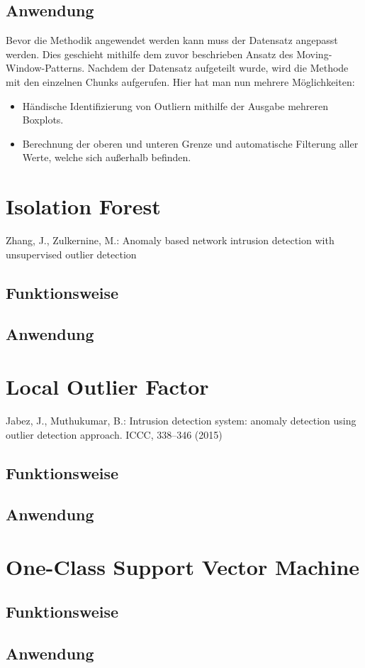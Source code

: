 \FloatBarrier

\subsection{Anwendung}
Bevor die Methodik angewendet werden kann muss der Datensatz angepasst werden. Dies geschieht mithilfe dem zuvor beschrieben Ansatz des Moving-Window-Patterns. Nachdem der Datensatz aufgeteilt wurde, wird die Methode mit den einzelnen Chunks aufgerufen. Hier hat man nun mehrere Möglichkeiten: 
\begin{itemize}
	\item Händische Identifizierung von Outliern mithilfe der Ausgabe mehreren Boxplots.
	\item Berechnung der oberen und unteren Grenze und automatische Filterung aller Werte, welche sich außerhalb befinden.
\end{itemize}

\newpage

\section{Isolation Forest}
Zhang, J., Zulkernine, M.: Anomaly based network intrusion detection with unsupervised outlier detection
\subsection{Funktionsweise}
\subsection{Anwendung}

\newpage

\section{Local Outlier Factor}
Jabez, J., Muthukumar, B.: Intrusion detection system: anomaly detection using outlier detection approach. ICCC, 338–346 (2015)
\subsection{Funktionsweise}
\subsection{Anwendung}

\newpage

\section{One-Class Support Vector Machine}
\subsection{Funktionsweise}
\subsection{Anwendung}

